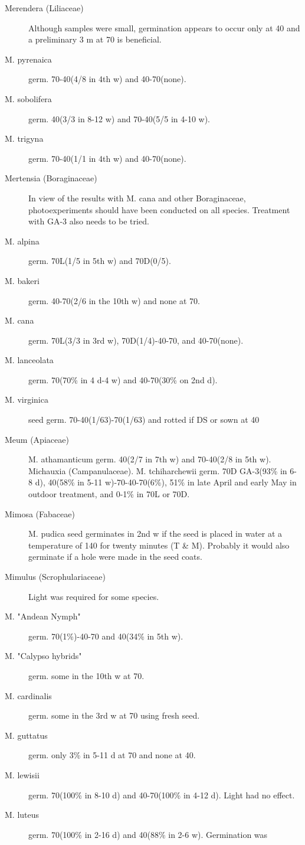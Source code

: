 \begin{description}
\item[Merendera (Liliaceae)] Although samples were small, germination
appears to occur only at 40 and a preliminary 3 m at 70 is beneficial.
\item[M. pyrenaica] germ. 70-40(4/8 in 4th w) and 40-70(none).
\item[M. sobolifera] germ. 40(3/3 in 8-12 w) and 70-40(5/5 in 4-10 w).
\item[M. trigyna] germ. 70-40(1/1 in 4th w) and 40-70(none).
\item[Mertensia (Boraginaceae)] In view of the results with M. cana and other
Boraginaceae, photoexperiments should have been conducted on all species.
Treatment with GA-3 also needs to be tried.
\item[M. alpina] germ. 70L(1/5 in 5th w) and 70D(0/5).
\item[M. bakeri] germ. 40-70(2/6 in the 10th w) and none at 70.
\item[M. cana] germ. 70L(3/3 in 3rd w), 70D(1/4)-40-70, and 40-70(none).
\item[M. lanceolata] germ. 70(70\% in 4 d-4 w) and 40-70(30\% on 2nd d).
\item[M. virginica] seed germ. 70-40(1/63)-70(1/63) and rotted if DS or sown at 40
\item[Meum (Apiaceae)] M. athamanticum germ. 40(2/7 in 7th w) and 70-40(2/8 in
5th w). Michauxia (Campanulaceae). M. tchiharchewii germ. 70D GA-3(93\% in 6-
8 d), 40(58\% in 5-11 w)-70-40-70(6\%), 51\% in late April and early May in outdoor
treatment, and 0-1\% in 70L or 70D.
\item[Mimosa (Fabaceae)] M. pudica seed germinates in 2nd w if the seed is
placed in water at a temperature of 140 for twenty minutes (T \& M). Probably it would
also germinate if a hole were made in the seed coats.
\item[Mimulus (Scrophulariaceae)] Light was required for some species.
\item[M. "Andean Nymph"] germ. 70(1\%)-40-70 and 40(34\% in 5th w).
\item[M. "Calypso hybrids"] germ. some in the 10th w at 70.
\item[M. cardinalis] germ. some in the 3rd w at 70 using fresh seed.
\item[M. guttatus] germ. only 3\% in 5-11 d at 70 and none at 40.
\item[M. lewisii] germ. 70(100\% in 8-10 d) and 40-70(100\% in 4-12 d). Light had no
effect.
\item[M. luteus] germ. 70(100\% in 2-16 d) and 40(88\% in 2-6 w). Germination was

\end{description}
